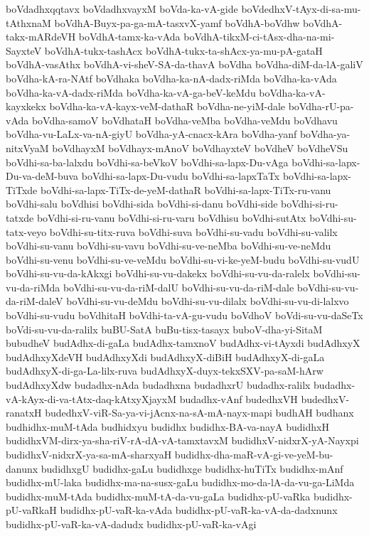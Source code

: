 {boVdadhxqqtavx
boVdadhxvayxM
boVda-ka-vA-gide
boVdedhxV-tAyx-di-sa-mu-tAthxnaM
boVdhA-Buyx-pa-ga-mA-tasxvX-yamf
boVdhA-boVdhw
boVdhA-takx-mARdeVH
boVdhA-tamx-ka-vAda
boVdhA-tikxM-ci-tAsx-dha-na-mi-SayxteV
boVdhA-tukx-tashAcx
boVdhA-tukx-ta-shAcx-ya-mu-pA-gataH
boVdhA-vasAthx
boVdhA-vi-sheV-SA-da-thavA
boVdha
boVdha-diM-da-lA-galiV
boVdha-kA-ra-NAtf
boVdhaka
boVdha-ka-nA-dadx-riMda
boVdha-ka-vAda
boVdha-ka-vA-dadx-riMda
boVdha-ka-vA-ga-beV-keMdu
boVdha-ka-vA-kayxkekx
boVdha-ka-vA-kayx-veM-dathaR
boVdha-ne-yiM-dale
boVdha-rU-pa-vAda
boVdha-samoV
boVdhataH
boVdha-veMba
boVdha-veMdu
boVdhavu
boVdha-vu-LaLx-va-nA-giyU
boVdha-yA-cnacx-kAra
boVdha-yanf
boVdha-ya-nitxVyaM
boVdhayxM
boVdhayx-mAnoV
boVdhayxteV
boVdheV
boVdheVSu
boVdhi-sa-ba-lalxdu
boVdhi-sa-beVkoV
boVdhi-sa-lapx-Du-vAga
boVdhi-sa-lapx-Du-va-deM-buva
boVdhi-sa-lapx-Du-vudu
boVdhi-sa-lapxTaTx
boVdhi-sa-lapx-TiTxde
boVdhi-sa-lapx-TiTx-de-yeM-dathaR
boVdhi-sa-lapx-TiTx-ru-vanu
boVdhi-salu
boVdhisi
boVdhi-sida
boVdhi-si-danu
boVdhi-side
boVdhi-si-ru-tatxde
boVdhi-si-ru-vanu
boVdhi-si-ru-varu
boVdhisu
boVdhi-sutAtx
boVdhi-su-tatx-veyo
boVdhi-su-titx-ruva
boVdhi-suva
boVdhi-su-vadu
boVdhi-su-valilx
boVdhi-su-vanu
boVdhi-su-vavu
boVdhi-su-ve-neMba
boVdhi-su-ve-neMdu
boVdhi-su-venu
boVdhi-su-ve-veMdu
boVdhi-su-vi-ke-yeM-budu
boVdhi-su-vudU
boVdhi-su-vu-da-kAkxgi
boVdhi-su-vu-dakekx
boVdhi-su-vu-da-ralelx
boVdhi-su-vu-da-riMda
boVdhi-su-vu-da-riM-dalU
boVdhi-su-vu-da-riM-dale
boVdhi-su-vu-da-riM-daleV
boVdhi-su-vu-deMdu
boVdhi-su-vu-dilalx
boVdhi-su-vu-di-lalxvo
boVdhi-su-vudu
boVdhitaH
boVdhi-ta-vA-gu-vudu
boVdhoV
boVdi-su-vu-daSeTx
boVdi-su-vu-da-ralilx
buBU-SatA
buBu-tisx-tasayx
buboV-dha-yi-SitaM
bubudheV
budAdhx-di-gaLa
budAdhx-tamxnoV
budAdhx-vi-tAyxdi
budAdhxyX
budAdhxyXdeVH
budAdhxyXdi
budAdhxyX-diBiH
budAdhxyX-di-gaLa
budAdhxyX-di-ga-La-lilx-ruva
budAdhxyX-duyx-tekxSXV-pa-saM-hArw
budAdhxyXdw
budadhx-nAda
budadhxna
budadhxrU
budadhx-ralilx
budadhx-vA-kAyx-di-va-tAtx-daq-kAtxyXjayxM
budadhx-vAnf
budedhxVH
budedhxV-ranatxH
budedhxV-viR-Sa-ya-vi-jAcnx-na-sA-mA-nayx-mapi
budhAH
budhanx
budhidhx-muM-tAda
budhidxyu
budidhx
budidhx-BA-va-nayA
budidhxH
budidhxVM-dirx-ya-sha-riV-rA-dA-vA-tamxtavxM
budidhxV-nidxrX-yA-Nayxpi
budidhxV-nidxrX-ya-sa-mA-sharxyaH
budidhx-dha-maR-vA-gi-ve-yeM-bu-danunx
budidhxgU
budidhx-gaLu
budidhxge
budidhx-huTiTx
budidhx-mAnf
budidhx-mU-laka
budidhx-ma-na-susx-gaLu
budidhx-mo-da-lA-da-vu-ga-LiMda
budidhx-muM-tAda
budidhx-muM-tA-da-vu-gaLa
budidhx-pU-vaRka
budidhx-pU-vaRkaH
budidhx-pU-vaR-ka-vAda
budidhx-pU-vaR-ka-vA-da-dadxnunx
budidhx-pU-vaR-ka-vA-dadudx
budidhx-pU-vaR-ka-vAgi
}
